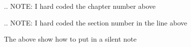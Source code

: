 .. NOTE: I hard coded the chapter number above


.. NOTE: I hard coded the section number in the line above

The above show how to put in a silent note